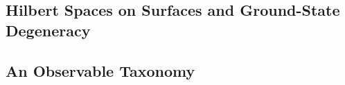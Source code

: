 
\subsection{Hilbert Spaces on Surfaces and Ground-State Degeneracy}
\label{subsec:hilbert-surfaces-gsd}


\subsection{An Observable Taxonomy}
\label{subsec:observable-taxonomy}


